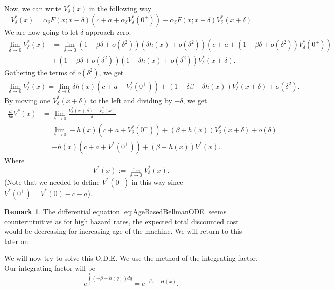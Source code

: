 \documentclass[a4paper]{thesis}
\theoremstyle{definition}
\newtheorem{remark}{Remark}[chapter]
\begin{document}
Now, we can write $V^*_\delta(x)$ in the following way
\[V^*_\delta(x)=\alpha_\delta \bar F(x;x-\delta) (c+a+\alpha_\delta V^*_\delta(0^+))
+\alpha_\delta \bar F(x;x-\delta)V^*_\delta(x+\delta)
\]
We are now going to let $\delta$ approach zero.
\begin{equation}
\begin{split}
\lim\limits_{\delta\rightarrow 0} V_\delta^*(x) &=
\lim\limits_{\delta\rightarrow 0}(1-\beta\delta+o(\delta^2)) (\delta h(x)+o(\delta^2))(c+a+(1-\beta\delta+o(\delta^2)) V^*_\delta(0^+))\\
&+(1-\beta\delta+o(\delta^2)) (1-\delta h(x)+o(\delta^2))V_\delta^*(x+\delta).
\end{split}
\end{equation}
Gathering the terms of $o(\delta^2)$, we get
\begin{equation}\label{eq:gatheredDelta}
\begin{split}
\lim\limits_{\delta\rightarrow 0} V_\delta^*(x) =
\lim\limits_{\delta\rightarrow 0}\delta h(x)(c+a+ V_\delta^*(0^+))+(1-\delta\beta-\delta h(x)) V_\delta^*(x+\delta)+o(\delta^2).
\end{split}
\end{equation}
By moving one $V_\delta^*(x+\delta)$ to the left and dividing by $-\delta$, we get
\begin{equation}\label{eq:AgeBasedBellmanODE}
\begin{split}
\frac{d}{dx}V^*(x)&=\lim\limits_{\delta\rightarrow 0} \frac{V_\delta^*(x+\delta)-V_\delta^*(x)}{\delta} \\
&=\lim\limits_{\delta\rightarrow 0} -h(x)(c+a+ V_\delta^*(0^+))+(\beta+ h(x)) V_\delta^*(x+\delta)+o(\delta)\\
&=-h(x)(c+a+ V^*(0^+))+(\beta+ h(x)) V^*(x).
\end{split}
\end{equation}
Where
$$
V^*(x):=\lim\limits_{\delta\rightarrow 0} V^*_\delta(x).
$$
(Note that we needed to define $V^*(0^+)$ in this way since $V^*(0^+)=V^*(0)-c-a$).
\begin{remark}\label{remark:AgeBasedWeirdODE}
	The differential equation \eqref{eq:AgeBasedBellmanODE} seems counterintuitive as for high hazard rates, the expected total discounted cost would be decreasing for increasing age of the machine.
	We will return to this later on.
\end{remark}
We will now try to solve this O.D.E.
We use the method of the integrating factor.
Our integrating factor will be
$$
e^{\int\limits_0^x (-\beta - h(q))dq}=e^{-\beta x -H(x)}.
$$
\end{document}
